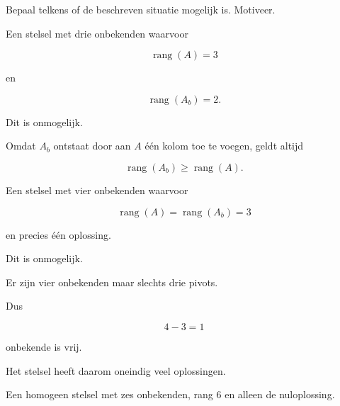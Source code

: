 \documentclass{ximera}
\begin{document}

\begin{oefening}{\oefG}

Bepaal telkens of de beschreven situatie mogelijk is.
Motiveer.


\begin{question}

Een stelsel met drie onbekenden waarvoor

\[
\operatorname{rang}(A)=3
\]

en

\[
\operatorname{rang}(A_b)=2.
\]

\begin{oplossing}

Dit is onmogelijk.

Omdat \(A_b\) ontstaat door aan \(A\) één kolom toe te voegen, geldt altijd

\[
\operatorname{rang}(A_b)
\geq
\operatorname{rang}(A).
\]

\end{oplossing}

\end{question}


\begin{question}

Een stelsel met vier onbekenden waarvoor

\[
\operatorname{rang}(A)
=
\operatorname{rang}(A_b)
=
3
\]

en precies één oplossing.

\begin{oplossing}

Dit is onmogelijk.

Er zijn vier onbekenden maar slechts drie pivots.

Dus

\[
4-3=1
\]

onbekende is vrij.

Het stelsel heeft daarom oneindig veel oplossingen.

\end{oplossing}

\end{question}


\begin{question}

Een homogeen stelsel met zes onbekenden, rang \(6\)
en alleen de nuloplossing.


\end{question}
\end{oefening}
\end{document}
